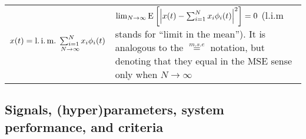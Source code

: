 \begin{xltabular}{\textwidth}{XX}
	\(x(t) = \limean_{N\rightarrow\infty}{\sum_{i=1}^{N} x_i \phi_i(t)}\)\cite{vantreesDetectionEstimationModulation2004}                                                                                                                                                                                        & \(\lim_{N\rightarrow\infty} \E{\abs{x(t) - \sum_{i=1}^{N} x_i \phi_i(t)}^{2}} = 0 \) (l.i.m stands for ``limit in the mean''). It is analogous to the \(\overset{m.s.e}{=}\) notation, but denoting that they equal in the MSE sense only when \(N\rightarrow\infty\)
\end{xltabular}


\subsection{Signals, (hyper)parameters, system performance, and criteria}
